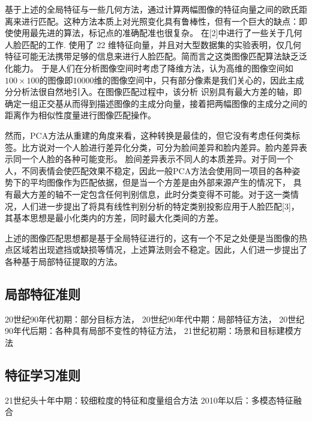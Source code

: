基于上述的全局特征与一些几何方法，通过计算两幅图像的特征向量之间的欧氏距离来进行匹配。这种方法本质上对光照变化具有鲁棒性，但有一个巨大的缺点：即使使用最先进的算法，标记点的准确配准也很复杂。
在[2]中进行了一些关于几何人脸匹配的工作. 使用了 22 维特征向量，并且对大型数据集的实验表明，仅几何特征可能无法携带足够的信息来进行人脸匹配。简而言之这类图像匹配算法缺乏泛化能力。
于是人们在分析图像空间时考虑了降维方法，认为高维的图像空间如$100 \times 100$的图像即10000维的图像空间中，只有部分像素是我们关心的，因此主成分分析法很自然地引入。在图像匹配过程中，该分析
识别具有最大方差的轴，即确定一组正交基从而得到描述图像的主成分向量，接着把两幅图像的主成分之间的距离作为相似性度量进行图像匹配操作。

然而，PCA方法从重建的角度来看，这种转换是最佳的，但它没有考虑任何类标签。比方说对一个人脸进行差异化分类，可分为脸间差异和脸内差异。脸内差异表示同一个人脸的各种可能变形。
脸间差异表示不同人的本质差异。对于同一个人，不同表情会使匹配效果不稳定，因此一般PCA方法会使用同一项目的各种姿势下的平均图像作为匹配依据，但是当一个方差是由外部来源产生的情况下，
具有最大方差的轴不一定包含任何判别信息，此时分类变得不可能。对于这一类情况，人们进一步提出了将具有线性判别分析的特定类别投影应用于人脸匹配[3]，其基本思想是最小化类内的方差，同时最大化类间的方差。

上述的图像匹配思想都是基于全局特征进行的，这有一个不足之处便是当图像的热点区域若出现遮挡或缺损等情况，上述算法则会不稳定。因此，人们进一步提出了各种基于局部特征提取的方法。

\subsection{局部特征准则}

20世纪90年代初期：部分目标方法，
20世纪90年代中期：局部特征方法，
20世纪90年代后期：各种具有局部不变性的特征方法，
21世纪初期：场景和目标建模方法

\subsection{特征学习准则}

21世纪头十年中期：较细粒度的特征和度量组合方法
2010年以后：多模态特征融合
